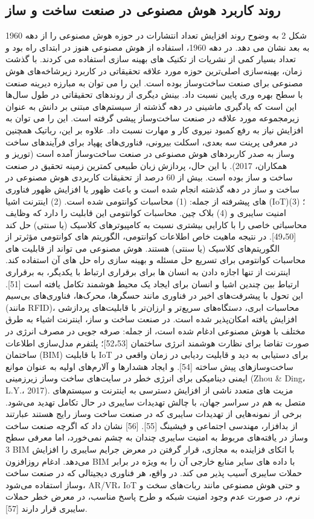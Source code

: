 \documentclass[towcolumn, 11pt]{Article}
\begin{document}
\begin{چکیده}
\subsection{روند کاربرد هوش مصنوعی در صنعت ساخت و ساز}
شکل 2 به وضوح روند افزایش تعداد انتشارات در حوزه هوش مصنوعی را از دهه 1960 به بعد نشان می دهد. در دهه 1960، استفاده از هوش مصنوعی هنوز در ابتدای راه بود و تعداد بسیار کمی از نشریات از تکنیک های بهینه سازی استفاده می کردند. با گذشت زمان، بهینه‌سازی اصلی‌ترین حوزه مورد علاقه تحقیقاتی در کاربرد زیرشاخه‌های هوش مصنوعی برای صنعت ساخت‌وساز بوده است. این را می توان به مبارزه دیرینه صنعت با سطح بهره وری پایین نسبت داد. بینش دیگری از روندهای تحقیقاتی در طول سال‌ها این است که یادگیری ماشینی در دهه گذشته از سیستم‌های مبتنی بر دانش به عنوان زیرمجموعه مورد علاقه در صنعت ساخت‌وساز پیشی گرفته است. این را می توان به افزایش نیاز به رفع کمبود نیروی کار و مهارت نسبت داد. علاوه بر این، رباتیک همچنین در معرفی پرینت سه بعدی، اسکلت بیرونی، فناوری‌های پهپاد برای فرآیندهای ساخت ‌وساز به صدر کاربردهای هوش مصنوعی در صنعت ساخت‌وساز آمده است (توریز و همکاران، 2017). با این حال، پردازش زبان طبیعی کمترین زمینه تحقیق در صنعت ساخت و ساز بوده است.
بیش از 60 درصد از تحقیقات کاربردی هوش مصنوعی در ساخت و ساز در دهه گذشته انجام شده است و باعث ظهور یا افزایش ظهور فناوری های پیشرفته از جمله: (1) محاسبات کوانتومی شده است. (2) اینترنت اشیا (IoT)؛ (3) امنیت سایبری و (4) بلاک چین. محاسبات کوانتومی این قابلیت را دارد که وظایف محاسباتی خاصی را با کارایی بیشتری نسبت به کامپیوترهای کلاسیک (یا سنتی) حل کند [49،50]. در نتیجه ماهیت خاص اطلاعات کوانتومی، الگوریتم ‌های کوانتومی مؤثرتر از الگوریتم‌های کلاسیک (یا سنتی) هستند. هوش مصنوعی می تواند از قابلیت های محاسبات کوانتومی برای تسریع حل مسئله و بهینه سازی راه حل های آن استفاده کند.
اینترنت از تنها اجازه دادن به انسان ها برای برقراری ارتباط با یکدیگر، به برقراری ارتباط بین چندین اشیا و انسان برای ایجاد یک محیط هوشمند تکامل یافته است [51]. این تحول با پیشرفت‌های اخیر در فناوری مانند حسگرها، محرک‌ها، فناوری‌های بی‌سیم (مانند RFID)، محاسبات ابری، دستگاه‌های سریع‌تر و ارزان‌تر با قابلیت‌های پردازشی افزایش یافته امکان‌پذیر شده است. در صنعت ساخت و ساز، اینترنت اشیاء به طرق مختلف با هوش مصنوعی ادغام شده است، از جمله: صرفه جویی در مصرف انرژی در صورت تقاضا برای نظارت هوشمند انرژی ساختمان [52،53]؛ پلتفرم مدل‌سازی اطلاعات ساختمان (BIM) با قابلیت IoT برای دستیابی به دید و قابلیت ردیابی در زمان واقعی در ساخت‌وسازهای پیش ساخته [54]. و ایجاد هشدارها و آلارم‌های اولیه به عنوان موانع ایمنی دینامیکی برای انرژی خطر در سایت‌های ساخت‌ وساز زیرزمینی (Zhou & Ding، L.Y.، 2017).
مزیت‌ های متعدد ناشی از افزایش دسترسی به اینترنت و سیستم‌های متصل به هم در سراسر جهان، با چالش تهدیدات سایبری در حال تکامل تهدید می‌شود. برخی از نمونه‌هایی از تهدیدات سایبری که در صنعت ساخت‌ وساز رایج هستند عبارتند از بدافزار، مهندسی اجتماعی و فیشینگ [55]. [56] نشان داد که اگرچه صنعت ساخت‌ وساز در یافته‌های مربوط به امنیت سایبری چندان به چشم نمی‌خورد، اما معرفی سطح 3 BIM با اتکای فزاینده به مجازی، قرار گرفتن در معرض جرایم سایبری را افزایش می‌دهد. ادغام روزافزون BIM با داده های سایر منابع خارجی آن را به ویژه در برابر حملات سایبری آسیب پذیر می کند. در واقع، هر فناوری دیجیتالی که در صنعت ساخت ‌وساز استفاده می‌شود، AR/VR، IoT و حتی هوش مصنوعی مانند ربات‌های سخت و نرم، در صورت عدم وجود امنیت شبکه و طرح پاسخ مناسب، در معرض خطر حملات سایبری قرار دارند [57].

\end{چکیده}
\end{document}
